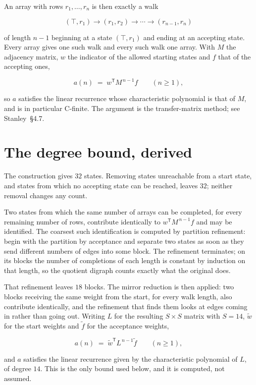 \documentclass[11pt]{article}
\theoremstyle{definition}
\begin{document}
An array with rows $r_1,\dots,r_n$ is then exactly a walk

\[(\top,r_1) \to (r_1,r_2) \to \cdots \to (r_{n-1},r_n)\]

of length $n-1$ beginning at a state $(\top,r_1)$ and ending at an accepting state. Every array gives one such walk and every such walk one array. With $M$ the adjacency matrix, $w$ the indicator of the allowed starting states and $f$ that of the accepting ones,

\[a(n) \;=\; w^{\mathsf T} M^{\,n-1} f \qquad (n \ge 1),\]

so $a$ satisfies the linear recurrence whose characteristic polynomial is that of $M$, and is in particular C-finite. The argument is the transfer-matrix method; see Stanley~\S4.7.

\section{The degree bound, derived}

The construction gives $32$ states. Removing states unreachable from a start state, and states from which no accepting state can be reached, leaves $32$; neither removal changes any count.

Two states from which the same number of arrays can be completed, for every remaining number of rows, contribute identically to $w^{\mathsf T}M^{\,n-1}f$ and may be identified. The coarsest such identification is computed by partition refinement: begin with the partition by acceptance and separate two states as soon as they send different numbers of edges into some block. The refinement terminates; on its blocks the number of completions of each length is constant by induction on that length, so the quotient digraph counts exactly what the original does.

That refinement leaves $18$ blocks. The mirror reduction is then applied: two blocks receiving the same weight from the start, for every walk length, also contribute identically, and the refinement that finds them looks at edges coming in rather than going out. Writing $L$ for the resulting $S \times S$ matrix with $S = 14$, $\tilde w$ for the start weights and $\tilde f$ for the acceptance weights,

\[a(n) \;=\; \tilde w^{\mathsf T} L^{\,n-1} \tilde f \qquad (n \ge 1),\]

and $a$ satisfies the linear recurrence given by the characteristic polynomial of $L$, of degree $14$. This is the only bound used below, and it is computed, not assumed.
\end{document}
